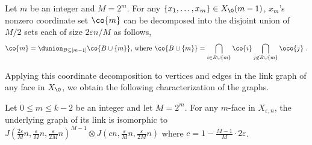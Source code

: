 \begin{corollary} \label{cor:face-decomposition} Let $m$ be an integer and $M = 2^m$.
For any $\{x_1,\dots,x_{m}\}\in X_\0(m-1)$, $x_m$'s nonzero coordinate set $\co{m}$ can be decomposed into the disjoint union of $M/2$ sets each of size $2\varepsilon n/M$ as follows,
\[\co{m} =  \dunion_{B\subseteq [m-1]} \co{B\cup\{m\}} \text{, where }  \co{B\cup\{m\}} = \bigcap_{i\in B\cup\{m\}} \co{i}  \bigcap_{j\not\in B\cup\{m\}} \oco{j}  ~.\]
\end{corollary}

Applying this coordinate decomposition to vertices and edges in the link graph of any face in $X_\0$, we obtain the following characterization of the graphs.
\begin{proposition} \label{prop:link-structure}
    Let \(0 \leq m \leq k-2\) be an integer and let \(M=2^m\). For any $m$-face in $X_{\varepsilon, n}$, the underlying graph of its link is isomorphic to
    \(J(\frac{2\varepsilon}{M}n,\frac{\varepsilon}{M}n,\frac{\varepsilon}{2M}n)^{M-1} \otimes J(cn,\frac{\varepsilon}{M}n,\frac{\varepsilon}{2M}n)\) where
    \(c = 1- \frac{M-1}{M}\cdot 2\varepsilon\).
\end{proposition}

